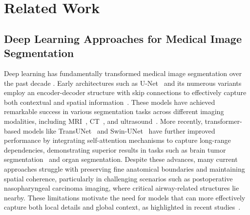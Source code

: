 \section{Related Work}
\subsection{Deep Learning Approaches for Medical Image Segmentation}
Deep learning has fundamentally transformed medical image segmentation over the past decade \cite{wang2022medical}. 
Early architectures such as U-Net~\cite{ronneberger2015u} and its numerous variants~\cite{qamar2020variant,lin2024mm} employ an encoder-decoder structure with skip connections to effectively capture both contextual and spatial information~\cite{azad2024medical}. 
These models have achieved remarkable success in various segmentation tasks across different imaging modalities, including MRI~\cite{guo2022cardiac}, CT~\cite{yang2024novel}, and ultrasound~\cite{chen2023rrcnet}. 
More recently, transformer-based models like TransUNet~\cite{chen2021transunet} and Swin-UNet~\cite{cao2022swin} have further improved performance by integrating self-attention mechanisms to capture long-range dependencies, demonstrating superior results in tasks such as brain tumor segmentation~\cite{zhang2021transfuse} and organ segmentation. 
Despite these advances, many current approaches struggle with preserving fine anatomical boundaries and maintaining spatial coherence, particularly in challenging scenarios such as postoperative nasopharyngeal carcinoma imaging, where critical airway-related structures lie nearby. 
These limitations motivate the need for models that can more effectively capture both local details and global context, as highlighted in recent studies~\cite{zhang2022understanding,rayed2024deep}.

